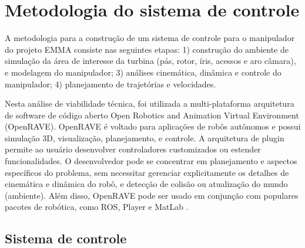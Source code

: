 \section{Metodologia do sistema de controle}
A metodologia para a construção de um sistema de controle para o manipulador do
projeto EMMA consiste nas seguintes etapas: 1) construção do ambiente de
simulação da área de interesse da turbina (pás, rotor, íris, acessos e aro
câmara), e modelagem do manipulador; 3) análises cinemática, dinâmica e
controle do manipulador; 4) planejamento de trajetórias e velocidades.

Nesta análise de viabilidade técnica, foi utilizada a 
multi-plataforma arquitetura de software de código aberto Open
Robotics and Animation Virtual Environment (OpenRAVE). OpenRAVE é voltado para
aplicações de robôs autônomos e possui simulação 3D, visualização, planejamento,
e controle. A arquitetura de plugin permite ao usuário desenvolver controladores
customizados ou estender funcionalidades. O desenvolvedor pode se
concentrar em planejamento e aspectos específicos do problema, sem necessitar
gerenciar explicitamente os detalhes de cinemática e dinâmica do robô, e
detecção de colisão ou atualização do mundo (ambiente). Além disso, OpenRAVE
pode ser usado em conjunção com populares pacotes de robótica, como ROS, Player e MatLab
\cite{diankov2008openrave}. 









\subsection{Sistema de controle}
